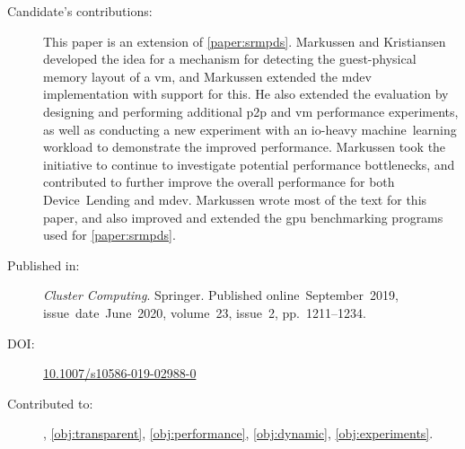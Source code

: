 \begin{description}
	\item[Candidate's contributions:]
		This paper is an extension of \cref{paper:srmpds}.
		Markussen and Kristiansen developed the idea for a mechanism for detecting the guest-physical memory layout of a \acrshort{vm}, and Markussen
		extended the \acrshort{mdev} implementation with support for this.
		He also extended the evaluation by designing and performing additional \acrshort{p2p} and \acrshort{vm} performance experiments,
		as well as conducting a new experiment with an \gls{io}-heavy machine~learning workload to demonstrate the improved performance.
		Markussen took the initiative to continue to investigate potential performance bottlenecks, and contributed to further improve the overall performance for both Device~Lending and \acrshort{mdev}.
		Markussen wrote most of the text for this paper, and also improved and extended the \acrshort{gpu} benchmarking programs used
		for \cref{paper:srmpds}.


	\item[Published in:]
		\emph{Cluster Computing}. Springer.
		Published online~September~2019,
		issue~date~June~2020,
		volume~23, issue~2, pp.~1211--1234.

	\item[DOI:] \href{https://doi.org/10.1007/s10586-019-02988-0}{10.1007/s10586-019-02988-0}

	\item[Contributed to:]
		, \cref{obj:transparent}, \cref{obj:performance}, \cref{obj:dynamic}, \cref{obj:experiments}.

\end{description}

